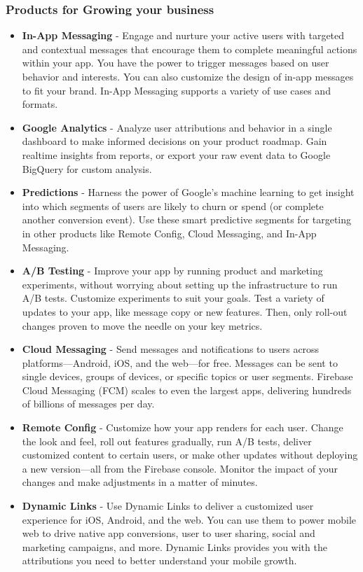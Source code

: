 \subsubsection{Products for Growing your business}
\begin{itemize}
    \item \textbf{In-App Messaging} - Engage and nurture your active users with targeted and contextual messages that encourage them to complete meaningful actions within your app. You have the power to trigger messages based on user behavior and interests. You can also customize the design of in-app messages to fit your brand. In-App Messaging supports a variety of use cases and formats.
    \item \textbf{Google Analytics} - Analyze user attributions and behavior in a single dashboard to make informed decisions on your product roadmap. Gain realtime insights from reports, or export your raw event data to Google BigQuery for custom analysis.
    \item \textbf{Predictions} - Harness the power of Google’s machine learning to get insight into which segments of users are likely to churn or spend (or complete another conversion event). Use these smart predictive segments for targeting in other products like Remote Config, Cloud Messaging, and In-App Messaging.
    \item \textbf{A/B Testing} - Improve your app by running product and marketing experiments, without worrying about setting up the infrastructure to run A/B tests. Customize experiments to suit your goals. Test a variety of updates to your app, like message copy or new features. Then, only roll-out changes proven to move the needle on your key metrics.
    \item \textbf{Cloud Messaging} - Send messages and notifications to users across platforms—Android, iOS, and the web—for free. Messages can be sent to single devices, groups of devices, or specific topics or user segments. Firebase Cloud Messaging (FCM) scales to even the largest apps, delivering hundreds of billions of messages per day.
    \item \textbf{Remote Config} - Customize how your app renders for each user. Change the look and feel, roll out features gradually, run A/B tests, deliver customized content to certain users, or make other updates without deploying a new version—all from the Firebase console. Monitor the impact of your changes and make adjustments in a matter of minutes.
    \item \textbf{Dynamic Links} - Use Dynamic Links to deliver a customized user experience for iOS, Android, and the web. You can use them to power mobile web to drive native app conversions, user to user sharing, social and marketing campaigns, and more. Dynamic Links provides you with the attributions you need to better understand your mobile growth.
    
    
\end{itemize}



